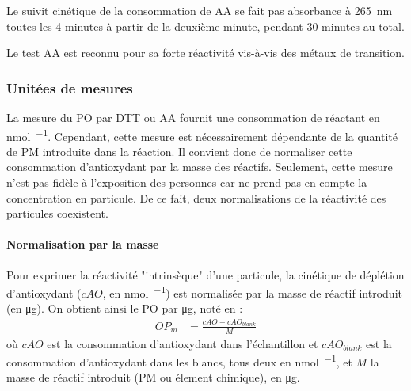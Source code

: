 Le suivit cinétique de la consommation de AA se fait pas absorbance à \SI{265}{\nano\m}
toutes les 4 minutes à partir de la deuxième minute, pendant 30 minutes au total.

Le test AA est reconnu pour sa forte réactivité vis-à-vis des métaux de transition. 


%
%
%

\subsubsection{Unitées de mesures}%
\label{ssub:unitees_de_mesures}

La mesure du PO par DTT ou AA fournit une consommation de réactant en \si{\nmol\per\min}.
Cependant, cette mesure est nécessairement dépendante de la quantité de PM introduite dans
la réaction.
Il convient donc de normaliser cette consommation d'antioxydant par la masse des réactifs.
Seulement, cette mesure n'est pas fidèle à l'exposition des personnes car ne prend pas en
compte la concentration en particule. De ce fait, deux normalisations de la réactivité des
particules coexistent.

\paragraph{Normalisation par la masse}%
\label{par:normalisation_par_la_masse}
Pour exprimer la réactivité "intrinsèque" d'une particule, la cinétique de déplétion
d'antioxydant ($cAO$, en \si{\nmol\per\min}) est normalisée par la masse de réactif
introduit (en \si{\ug}). On obtient ainsi le PO par \si{\ug}, noté \OPm{} en
\si{\opm}:
\begin{align}
    \label{eq:opm}
    OP_m &= \frac{cAO - cAO_{blank}}{M}
\end{align}
où $cAO$ est la consommation d'antioxydant dans l'échantillon et $cAO_{blank}$
est la consommation d'antioxydant dans les blancs, tous deux en \si{\nmol\per\min}, et $M$
la masse de réactif introduit (PM ou élement chimique), en \si{\ug}.

